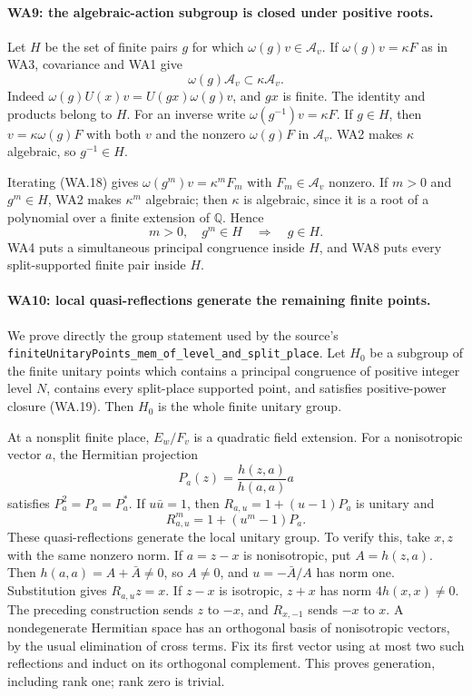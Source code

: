 \paragraph{WA9: the algebraic-action subgroup is closed under positive roots.}
Let $H$ be the set of finite pairs $g$ for which
$\omega(g)v\in\mathcal A_v$.  If
$\omega(g)v=\kappa F$ as in WA3, covariance and WA1 give
\[
                    \omega(g)\mathcal A_v\subset\kappa\mathcal A_v.
                                                               \tag{WA.18}
\]
Indeed $\omega(g)U(x)v=U(gx)\omega(g)v$, and $gx$ is finite.
The identity and products belong to $H$.  For an inverse write
$\omega(g^{-1})v=\kappa F$.  If $g\in H$, then
$v=\kappa\omega(g)F$ with both $v$ and the nonzero
$\omega(g)F$ in $\mathcal A_v$.  WA2 makes $\kappa$ algebraic,
so $g^{-1}\in H$.

Iterating (WA.18) gives
$\omega(g^m)v=\kappa^mF_m$ with $F_m\in\mathcal A_v$ nonzero.
If $m>0$ and $g^m\in H$, WA2 makes $\kappa^m$ algebraic;
then $\kappa$ is algebraic, since it is a root of a polynomial
over a finite extension of $\mathbb Q$.  Hence
\[
                      m>0,\quad g^m\in H
                                  \quad\Longrightarrow\quad g\in H.
                                                               \tag{WA.19}
\]
WA4 puts a simultaneous principal congruence inside $H$, and
WA8 puts every split-supported finite pair inside $H$.

\paragraph{WA10: local quasi-reflections generate the remaining finite points.}
We prove directly the group statement used by the source's
\texttt{finiteUnitaryPoints\_mem\_of\_level\_and\_split\_place}.
Let $H_0$ be a subgroup of the finite unitary points which contains
a principal congruence of positive integer level $N$, contains
every split-place supported point, and satisfies positive-power
closure (WA.19).  Then $H_0$ is the whole finite unitary group.

At a nonsplit finite place, $E_w/F_v$ is a quadratic field
extension.  For a nonisotropic vector $a$, the Hermitian projection
\[
            P_a(z)=\frac{h(z,a)}{h(a,a)}a
\]
satisfies $P_a^2=P_a=P_a^*$.  If $u\bar u=1$, then
$R_{a,u}=1+(u-1)P_a$ is unitary and
\[
                       R_{a,u}^{m}=1+(u^m-1)P_a.           \tag{WA.20}
\]
These quasi-reflections generate the local unitary group.  To
verify this, take $x,z$ with the same nonzero norm.  If
$a=z-x$ is nonisotropic, put $A=h(z,a)$.  Then
$h(a,a)=A+\bar A\ne0$, so $A\ne0$, and
$u=-\bar A/A$ has norm one.  Substitution gives
$R_{a,u}z=x$.  If $z-x$ is isotropic, $z+x$ has norm
$4h(x,x)\ne0$.  The preceding construction sends $z$ to $-x$,
and $R_{x,-1}$ sends $-x$ to $x$.  A nondegenerate Hermitian
space has an orthogonal basis of nonisotropic vectors, by the
usual elimination of cross terms.  Fix its first vector using
at most two such reflections and induct on its orthogonal
complement.  This proves generation, including rank one; rank
zero is trivial.

